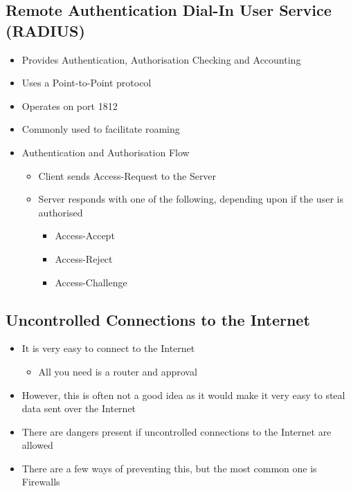 \subsection*{Remote Authentication Dial-In User Service (RADIUS)}

\begin{itemize}
  \item Provides Authentication, Authorisation Checking and Accounting
  \item Uses a Point-to-Point protocol
  \item Operates on port 1812
  \item Commonly used to facilitate roaming
  \item Authentication and Authorisation Flow
  \begin{itemize}
    \item Client sends Access-Request to the Server
    \item Server responds with one of the following, depending upon if the user is authorised
    \begin{itemize}
      \item Access-Accept
      \item Access-Reject
      \item Access-Challenge
    \end{itemize}
  \end{itemize}
\end{itemize}

\subsection*{Uncontrolled Connections to the Internet}

\begin{itemize}
  \item It is very easy to connect to the Internet
  \begin{itemize}
    \item All you need is a router and approval
  \end{itemize}
  \item However, this is often not a good idea as it would make it very easy to steal data sent over the Internet
  \item There are dangers present if uncontrolled connections to the Internet are allowed
  \item There are a few ways of preventing this, but the most common one is Firewalls
\end{itemize}


